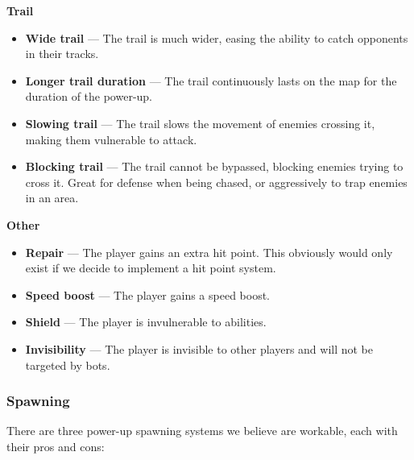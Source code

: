 \documentclass{article}
\theoremstyle{definition}
\begin{document}
\textbf{Trail}
\begin{itemize}
  \item \textbf{Wide trail} --- The trail is much wider, easing the ability to
    catch opponents in their tracks.
  \item \textbf{Longer trail duration} --- The trail continuously lasts on the
    map for the duration of the power-up.
  \item \textbf{Slowing trail} --- The trail slows the movement of enemies
    crossing it, making them vulnerable to attack.
  \item \textbf{Blocking trail} --- The trail cannot be bypassed, blocking
    enemies trying to cross it. Great for defense when being chased, or
    aggressively to trap enemies in an area.
\end{itemize}

\textbf{Other}
\begin{itemize}
  \item \textbf{Repair} --- The player gains an extra hit point. This obviously
    would only exist if we decide to implement a hit point system.
  \item \textbf{Speed boost} --- The player gains a speed boost.
  \item \textbf{}\textbf{Shield} --- The player is invulnerable to abilities.
  \item \textbf{Invisibility} --- The player is invisible to other players and
    will not be targeted by bots.
\end{itemize}

\subsubsection{Spawning}

There are three power-up spawning systems we believe are workable, each with
their pros and cons:
\end{document}
